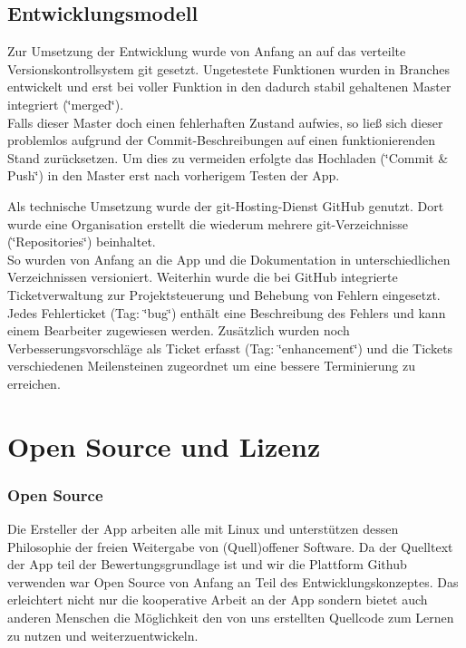 \documentclass[a4paper,ngerman,12pt]{scrreprt}
\newcommand{\+}{\discretionary{\mbox{\scriptsize$\hookleftarrow$}}{}{}}
\begin{document}
\section{Entwicklungsmodell}

Zur Umsetzung der Entwicklung wurde von Anfang an auf das verteilte Versionskontrollsystem git gesetzt. Ungetestete Funktionen wurden in Branches entwickelt und erst bei voller Funktion in den dadurch stabil gehaltenen Master integriert (\char`\"{}merged\char`\"{}). \\
Falls dieser Master doch einen fehlerhaften Zustand aufwies, so ließ sich dieser problemlos aufgrund der Commit-\/\+Beschreibungen auf einen funktionierenden Stand zurücksetzen. Um dies zu vermeiden erfolgte das Hochladen (\char`\"{}\+Commit \& Push\char`\"{}) in den Master erst nach vorherigem Testen der App. 

Als technische Umsetzung wurde der git-\/\+Hosting-\/\+Dienst Git\+Hub genutzt. Dort wurde eine Organisation erstellt die wiederum mehrere git-\/\+Verzeichnisse (\char`\"{}\+Repositories\char`\"{}) beinhaltet. \\
So wurden von Anfang an die App und die Dokumentation in unterschiedlichen Verzeichnissen versioniert. Weiterhin wurde die bei Git\+Hub integrierte Ticketverwaltung zur Projektsteuerung und Behebung von Fehlern eingesetzt.\\
Jedes Fehlerticket (Tag\+: \char`\"{}bug\char`\"{}) enthält eine Beschreibung des Fehlers und kann einem Bearbeiter zugewiesen werden. Zusätzlich wurden noch Verbesserungsvorschläge als Ticket erfasst (Tag\+: \char`\"{}enhancement\char`\"{}) und die Tickets verschiedenen Meilensteinen zugeordnet um eine bessere Terminierung zu erreichen. 

\chapter{Open Source und Lizenz}
\subsection*{Open Source}
Die Ersteller der App arbeiten alle mit Linux und unterstützen dessen Philosophie der freien Weitergabe von (Quell)offener Software. Da der Quelltext der App teil der Bewertungsgrundlage ist und wir die Plattform Github verwenden war Open Source von Anfang an Teil des Entwicklungskonzeptes. Das erleichtert nicht nur die kooperative Arbeit an der App sondern bietet auch anderen Menschen die Möglichkeit den von uns erstellten Quellcode zum Lernen zu nutzen und weiterzuentwickeln.
\end{document}
